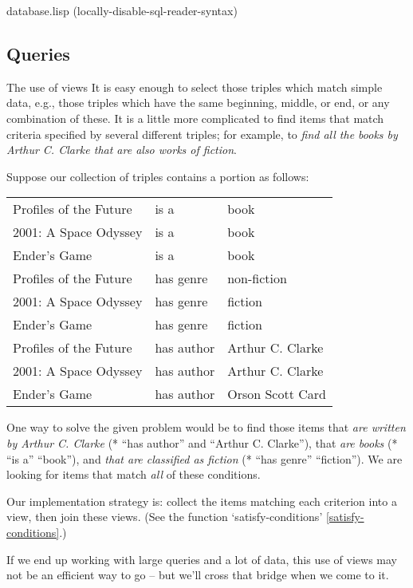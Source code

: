 \begin{common}{database.lisp}
(locally-disable-sql-reader-syntax)
\end{common}

\subsection{Queries} \label{queries}

\begin{notate}{The use of views} \label{use-of-views}
It is easy enough to select those triples which match
simple data, e.g., those triples which have the same
beginning, middle, or end, or any combination of these.
It is a little more complicated to find items that match
criteria specified by several different triples; for
example, to \emph{find all the books by Arthur C. Clarke
  that are also works of fiction}.

Suppose our collection of triples contains a portion as
follows:
\begin{center}
\begin{tabular}{lll}
Profiles of the Future & is a & book \\ 2001: A Space
Odyssey & is a & book \\ Ender's Game & is a & book
\\ Profiles of the Future & has genre & non-fiction
\\ 2001: A Space Odyssey & has genre & fiction \\ Ender's
Game & has genre & fiction \\ Profiles of the Future & has
author & Arthur C. Clarke \\ 2001: A Space Odyssey & has
author & Arthur C. Clarke \\ Ender's Game & has author &
Orson Scott Card
\end{tabular}
\end{center}

One way to solve the given problem would be to find those
items that \emph{are written by Arthur C. Clarke} (* ``has
author'' and ``Arthur C. Clarke''), that \emph{are books}
(* ``is a'' ``book''), and \emph{that are classified as
  fiction} (* ``has genre'' ``fiction'').  We are looking
for items that match \emph{all} of these conditions.

Our implementation strategy is: collect the items matching
each criterion into a view, then join these views.  (See
the function `satisfy-conditions'
\ref{satisfy-conditions}.)

If we end up working with large queries and a lot of data,
this use of views may not be an efficient way to go -- but
we'll cross that bridge when we come to it.
\end{notate}


